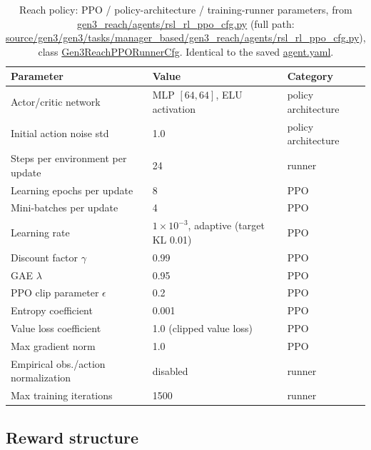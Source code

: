 \documentclass[11pt]{article}
\begin{document}
\begin{table}[h]
\centering
\caption{Reach policy: PPO / policy-architecture / training-runner parameters, from
\url{gen3_reach/agents/rsl_rl_ppo_cfg.py} (full path:
\url{source/gen3/gen3/tasks/manager_based/gen3_reach/agents/rsl_rl_ppo_cfg.py}),
class \url{Gen3ReachPPORunnerCfg}. Identical to the saved \url{agent.yaml}.}
\label{tab:reach_ppo}
\begin{tabular}{lll}
\toprule
Parameter & Value & Category \\
\midrule
Actor/critic network & MLP $[64, 64]$, ELU activation & policy architecture \\
Initial action noise std & 1.0 & policy architecture \\
Steps per environment per update & 24 & runner \\
Learning epochs per update & 8 & PPO \\
Mini-batches per update & 4 & PPO \\
Learning rate & $1\times10^{-3}$, adaptive (target KL 0.01) & PPO \\
Discount factor $\gamma$ & 0.99 & PPO \\
GAE $\lambda$ & 0.95 & PPO \\
PPO clip parameter $\epsilon$ & 0.2 & PPO \\
Entropy coefficient & 0.001 & PPO \\
Value loss coefficient & 1.0 (clipped value loss) & PPO \\
Max gradient norm & 1.0 & PPO \\
Empirical obs./action normalization & disabled & runner \\
Max training iterations & 1500 & runner \\
\bottomrule
\end{tabular}
\end{table}

\subsection{Reward structure}
\end{document}
